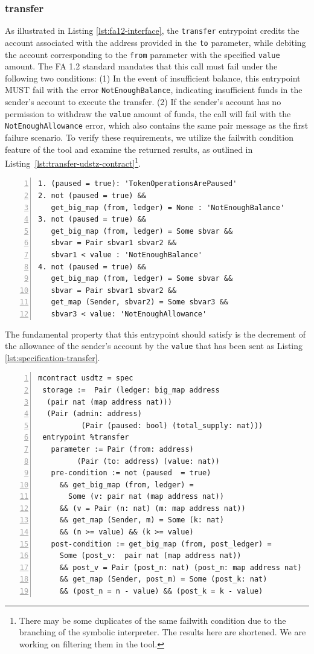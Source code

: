 \documentclass[a4paper,USenglish,cleveref, autoref, thm-restate]{lipics-v2021}
\begin{document}
\subsubsection{transfer}
As illustrated in Listing \ref{lst:fa12-interface}, the
\lstinline/transfer/ entrypoint credits the account associated with
the address provided in the \lstinline/to/ parameter, while debiting
the account corresponding to the \lstinline/from/ parameter with the
specified \lstinline/value/ amount. The FA 1.2 standard mandates that
this call must fail under the following two conditions: (1) In the
event of insufficient balance, this entrypoint MUST fail with the
error \lstinline/NotEnoughBalance/, indicating insufficient funds in
the sender's account to execute the transfer. (2) If the sender's
account has no permission to withdraw the \lstinline/value/ amount of
funds, the call will fail with the \lstinline/NotEnoughAllowance/
error, which also contains the same pair message as the first failure
scenario. To verify these requirements, we utilize the failwith
condition feature of the tool and examine the returned results, as
outlined in Listing~\ref{lst:transfer-udstz-contract}\footnote{There may be some duplicates of the same failwith condition due to the branching of the symbolic interpreter. The results here are shortened. We are working on filtering them in the tool.}.
\begin{lstlisting}[float,captionpos=b,caption={Fail conditions for the \lstinline/transfer/ entrypoint},label={lst:transfer-udstz-contract},numbers=left]
1. (paused = true): 'TokenOperationsArePaused'
2. not (paused = true) &&
   get_big_map (from, ledger) = None : 'NotEnoughBalance'
3. not (paused = true) &&
   get_big_map (from, ledger) = Some sbvar &&
   sbvar = Pair sbvar1 sbvar2 &&
   sbvar1 < value : 'NotEnoughBalance'
4. not (paused = true) &&
   get_big_map (from, ledger) = Some sbvar &&
   sbvar = Pair sbvar1 sbvar2 &&
   get_map (Sender, sbvar2) = Some sbvar3 &&
   sbvar3 < value: 'NotEnoughAllowance'
\end{lstlisting}
The fundamental property that this entrypoint should satisfy is the decrement of the allowance of the sender's account by the \lstinline/value/ that has been sent as Listing \ref{lst:specification-transfer}.
\begin{lstlisting}[float,captionpos=b,caption={Specification of the \lstinline/transfer/ entrypoint},label={lst:specification-transfer},numbers=left]
mcontract usdtz = spec 
 storage :=  Pair (ledger: big_map address 
  (pair nat (map address nat))) 
  (Pair (admin: address) 
          (Pair (paused: bool) (total_supply: nat)))
 entrypoint %transfer
   parameter := Pair (from: address)
         (Pair (to: address) (value: nat))
   pre-condition := not (paused  = true)
     && get_big_map (from, ledger) = 
       Some (v: pair nat (map address nat))
     && (v = Pair (n: nat) (m: map address nat))
     && get_map (Sender, m) = Some (k: nat) 
     && (n >= value) && (k >= value)
   post-condition := get_big_map (from, post_ledger) = 
     Some (post_v:  pair nat (map address nat))
     && post_v = Pair (post_n: nat) (post_m: map address nat) 
     && get_map (Sender, post_m) = Some (post_k: nat) 
     && (post_n = n - value) && (post_k = k - value)
\end{lstlisting}
\end{document}
